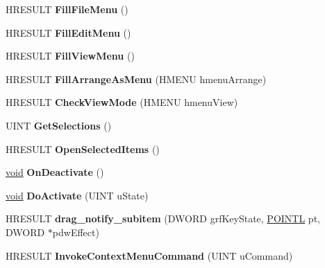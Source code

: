 \begin{DoxyCompactItemize}
H\+R\+E\+S\+U\+LT {\bfseries Fill\+File\+Menu} ()
\item 
\mbox{\label{class_c_def_view_a2a5b95d0854bf18e4057174ff3c53bce}} 
H\+R\+E\+S\+U\+LT {\bfseries Fill\+Edit\+Menu} ()
\item 
\mbox{\label{class_c_def_view_ae12fd9e3537adecce641424f87e0109d}} 
H\+R\+E\+S\+U\+LT {\bfseries Fill\+View\+Menu} ()
\item 
\mbox{\label{class_c_def_view_a976dcdd56d46821607fc59b22a3c5546}} 
H\+R\+E\+S\+U\+LT {\bfseries Fill\+Arrange\+As\+Menu} (H\+M\+E\+NU hmenu\+Arrange)
\item 
\mbox{\label{class_c_def_view_a587b7d086a3e146d1adff8414115bfe6}} 
H\+R\+E\+S\+U\+LT {\bfseries Check\+View\+Mode} (H\+M\+E\+NU hmenu\+View)
\item 
\mbox{\label{class_c_def_view_ac66c75e84b62f12d63431bd7963914ce}} 
U\+I\+NT {\bfseries Get\+Selections} ()
\item 
\mbox{\label{class_c_def_view_a7976af5502faf288e9cca44ecc1242a5}} 
H\+R\+E\+S\+U\+LT {\bfseries Open\+Selected\+Items} ()
\item 
\mbox{\label{class_c_def_view_a8dd5fbe12ab501e81fd78f223afeb02c}} 
\hyperlink{interfacevoid}{void} {\bfseries On\+Deactivate} ()
\item 
\mbox{\label{class_c_def_view_afb5829a51bfcd0115ba25d63e7d28e11}} 
\hyperlink{interfacevoid}{void} {\bfseries Do\+Activate} (U\+I\+NT u\+State)
\item 
\mbox{\label{class_c_def_view_a3d06275b8085f4d046aebc3dda89d73b}} 
H\+R\+E\+S\+U\+LT {\bfseries drag\+\_\+notify\+\_\+subitem} (D\+W\+O\+RD grf\+Key\+State, \hyperlink{struct___p_o_i_n_t_l}{P\+O\+I\+N\+TL} pt, D\+W\+O\+RD $\ast$pdw\+Effect)
\item 
\mbox{\label{class_c_def_view_a3ccb7b459035e44f3fcc6f5a3af2d4c3}} 
H\+R\+E\+S\+U\+LT {\bfseries Invoke\+Context\+Menu\+Command} (U\+I\+NT u\+Command)
\item 

\end{DoxyCompactItemize}
